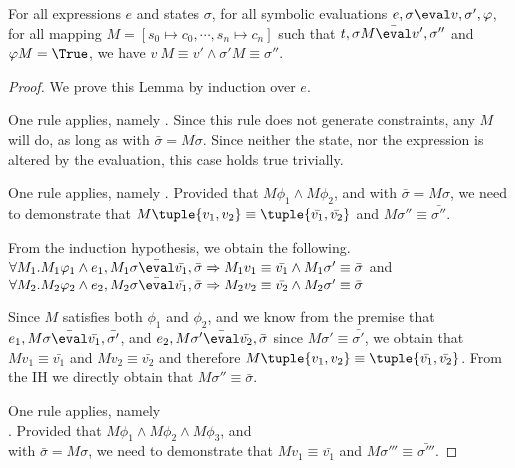 \begin{lemma}
  \label{lem:soundeval}

  For all expressions $e$ and states $\sigma$,
  for all symbolic evaluations $e,\sigma\eval v,\sigma',\phi$,
  for all mapping $M=[s_0\mapsto c_0,\cdots,s_n\mapsto c_n]$
  such that $t,\sigma M \bar{\eval}v',\sigma''$ and $\phi M = \True$,
  we have $v\ M \equiv v' \wedge \sigma' M \equiv \sigma''$.

\end{lemma}

\begin{proof}
  We prove this Lemma by induction over $e$.

  {One rule applies, namely .
  Since this rule does not generate constraints, any $M$ will do, as long as  with $\bar{\sigma}=M \sigma$. Since neither the state, nor the expression is altered by the evaluation, this case holds true trivially.}

  {One rule applies, namely .
  Provided that $M\phi_1\wedge M\phi_2$, and  with $\bar{\sigma}=M\sigma$,
  we need to demonstrate that $M\tuple{v_1,v_2} \equiv \tuple{\bar{v_1},\bar{v_2}}$ and $M\sigma''\equiv\bar{\sigma''}$.

  From the induction hypothesis, we obtain the following. $\forall M_1 .  M_1\phi_1 \wedge e_1, M_1\sigma \bar{\eval}\bar{v_1},\bar{\sigma}\implies  M_1v_1\equiv \bar{v_1} \wedge  M_1\sigma'\equiv\bar{\sigma}$ and
  $\forall M_2 . M_2\phi_2 \wedge e_2,M_2\sigma \bar{\eval}\bar{v_1},\bar{\sigma}\implies M_2v_2\equiv \bar{v_2} \wedge M_2\sigma'\equiv\bar{\sigma}$

  Since $M$ satisfies both $\phi_1$ and $\phi_2$,
  and we know from the premise that $e_1,M\sigma \bar{\eval}\bar{v_1},\bar{\sigma'}$,
  and $e_2,M\sigma'\bar{\eval}\bar{v_2},\bar{\sigma}$ since $M\sigma'\equiv \bar{\sigma'}$,
  we obtain that $M v_1\equiv \bar{v_1}$ and $M v_2 \equiv \bar{v_2}$ and therefore $M\tuple{v_1,v_2} \equiv \tuple{\bar{v_1},\bar{v_2}}$.
  From the IH we directly obtain that $M \sigma'' \equiv\bar{\sigma}$.
  }

  {One rule applies, namely\\
  .
  Provided that $M\phi_1 \land M\phi_2\land M\phi_3$, and\\
   with $\bar{\sigma}=M\sigma$,
  we need to demonstrate that $M v_1 \equiv \bar{v_1}$ and $M\sigma'''\equiv\bar{\sigma'''}$.

}
\end{proof}
